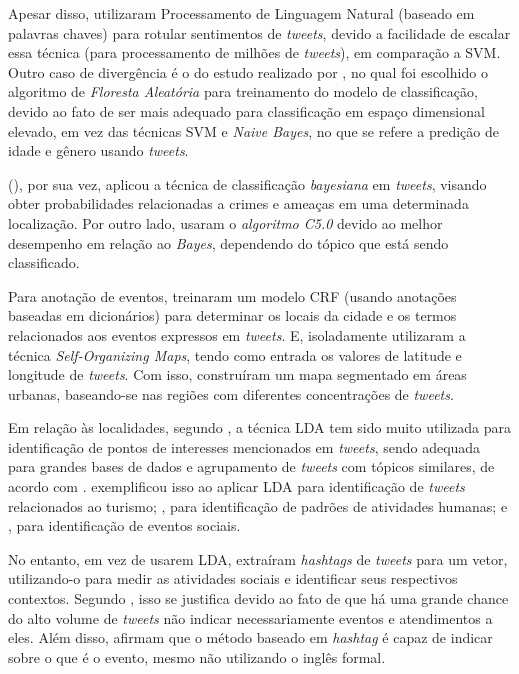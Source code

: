 \documentclass[
	12pt,				%
	oneside,			%
	a4paper,			%
	english,			%
	brazil				%
	]{abntex2ppgsi}
\begin{document}
{{Apesar disso, \cite{Guo2016} utilizaram Processamento de Linguagem Natural (baseado em palavras chaves) para rotular sentimentos de \textit{tweets}, devido a facilidade de escalar essa técnica (para processamento de milhões de \textit{tweets}), em comparação a SVM. Outro caso de divergência é o do estudo realizado por \cite{Farseev2015}, no qual foi escolhido o algoritmo de \textit{Floresta Aleatória} para treinamento do modelo de classificação, devido ao fato de ser mais adequado para classificação em espaço dimensional elevado, em vez das técnicas SVM e \textit{Naive Bayes}, no que se refere a predição de idade e gênero usando \textit{tweets}.

\citeauthor{Mata2015} (\citeyear{Mata2015}), por sua vez, aplicou a técnica de classificação \textit{bayesiana} em \textit{tweets}, visando obter probabilidades relacionadas a crimes e ameaças em uma determinada localização. Por outro lado, \cite{Zagal2016} usaram o \textit{algoritmo C5.0} devido ao melhor desempenho em relação ao \textit{Bayes}, dependendo do tópico que está sendo classificado. 

Para anotação de eventos, \cite{Anantharam2015} treinaram um modelo CRF (usando anotações baseadas em dicionários) para determinar os locais da cidade e os termos relacionados aos eventos expressos em \textit{tweets}. E, isoladamente \cite{Frias-Martinez2014} utilizaram a técnica \textit{Self-Organizing Maps}, tendo como entrada os valores de latitude e longitude de \textit{tweets}. Com isso, construíram um mapa segmentado em áreas urbanas, baseando-se nas regiões com diferentes concentrações de \textit{tweets}.

Em relação às localidades, segundo \cite{Farseev2015}, a técnica LDA tem sido muito utilizada para identificação de pontos de interesses mencionados em \textit{tweets}, sendo adequada para grandes bases de dados e agrupamento de \textit{tweets} com tópicos similares, de acordo com \cite{Steiger2015Census}. \cite{Abbasi2015} exemplificou isso ao aplicar LDA para identificação de \textit{tweets} relacionados ao turismo; \cite{Hasan2014}, para identificação de padrões de atividades humanas; e \cite{DiLorenzo2013}, para identificação de eventos sociais.

No entanto, \cite{Ni2016} em vez de usarem LDA, extraíram \textit{hashtags} de \textit{tweets} para um vetor, utilizando-o para medir as atividades sociais e identificar seus respectivos contextos. Segundo \cite{Ni2016}, isso se justifica devido ao fato de que há uma grande chance do alto volume de \textit{tweets} não indicar necessariamente eventos e atendimentos a eles. Além disso, afirmam que o método baseado em \textit{hashtag} é capaz de indicar sobre o que é o evento, mesmo não utilizando o inglês formal.

}}
\end{document}
